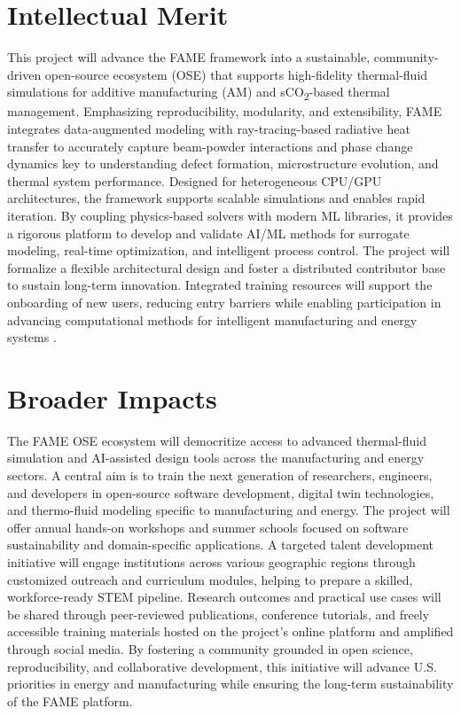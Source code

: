 \documentclass[11pt]{article}
\newcommand{\CO}[1]{CO\textsubscript{#1}}
\begin{document}
\section*{Intellectual Merit}
\vspace{-3pt}
\noindent
This project will advance the FAME framework into a sustainable, community-driven open-source ecosystem (OSE) that supports high-fidelity thermal-fluid simulations for additive manufacturing (AM) and s\CO{2}-based thermal management. Emphasizing reproducibility, modularity, and extensibility, FAME integrates data-augmented modeling with ray-tracing-based radiative heat transfer to accurately capture beam-powder interactions and phase change dynamics key to understanding defect formation, microstructure evolution, and thermal system performance. Designed for heterogeneous CPU/GPU architectures, the framework supports scalable simulations and enables rapid iteration. By coupling physics-based solvers with modern ML libraries, it provides a rigorous platform to develop and validate AI/ML methods for surrogate modeling, real-time optimization, and intelligent process control. The project will formalize a flexible architectural design and foster a distributed contributor base to sustain long-term innovation. Integrated training resources will support the onboarding of new users, reducing entry barriers while enabling participation in advancing computational methods for intelligent manufacturing and energy systems \cite{aminComputationalHomogenizationElastic2018,aminHighThroughputParticle2014,aminMechanicalAnalysisMgB22017,aminMultiscaleMultiphysicsModel2016,aminMULTISCALEMULTIPHYSICSTHERMOMECHANICAL2018}.
\vspace{-3pt}
\section*{Broader Impacts}
\vspace{-3pt}
\noindent
The FAME OSE ecosystem will democritize access to advanced thermal-fluid simulation and AI-assisted design tools across the manufacturing and energy sectors. A central aim is to train the next generation of researchers, engineers, and developers in open-source software development, digital twin technologies, and thermo-fluid modeling specific to manufacturing and energy. The project will offer annual hands-on workshops and summer schools focused on software sustainability and domain-specific applications. A targeted talent development initiative will engage institutions across various geographic regions through customized outreach and curriculum modules, helping to prepare a skilled, workforce-ready STEM pipeline. Research outcomes and practical use cases will be shared through peer-reviewed publications, conference tutorials, and freely accessible training materials hosted on the project's online platform and amplified through social media. By fostering a community grounded in open science, reproducibility, and collaborative development, this initiative will advance U.S. priorities in energy and manufacturing while ensuring the long-term sustainability of the FAME platform.
\end{document}
